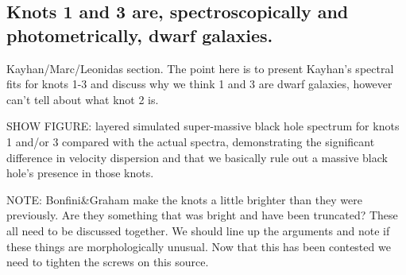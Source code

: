 \documentclass[useAMS,usenatbib]{emulateapj}
\newcommand{\fixme}[1]{{\color{red} #1 }}
\begin{document}


\subsection{Knots 1 and 3 are, spectroscopically and photometrically, dwarf galaxies.}
\fixme{Kayhan/Marc/Leonidas section.} The point here is to present Kayhan's spectral fits for knots 1-3 and discuss why we think 1 and 3 are dwarf galaxies, however can't tell about what knot 2 is.

SHOW FIGURE: layered simulated super-massive black hole spectrum for knots 1 and/or 3 compared with the actual spectra, demonstrating the significant difference in velocity dispersion and that we basically rule out a massive black hole's presence in those knots.

NOTE: Bonfini\&Graham make the knots a little brighter than they were previously. Are they something that was bright and have been truncated? These all need to be discussed together. We should line up the arguments and note if these things are morphologically unusual. Now that this has been contested we need to tighten the screws on this source.
\end{document}
